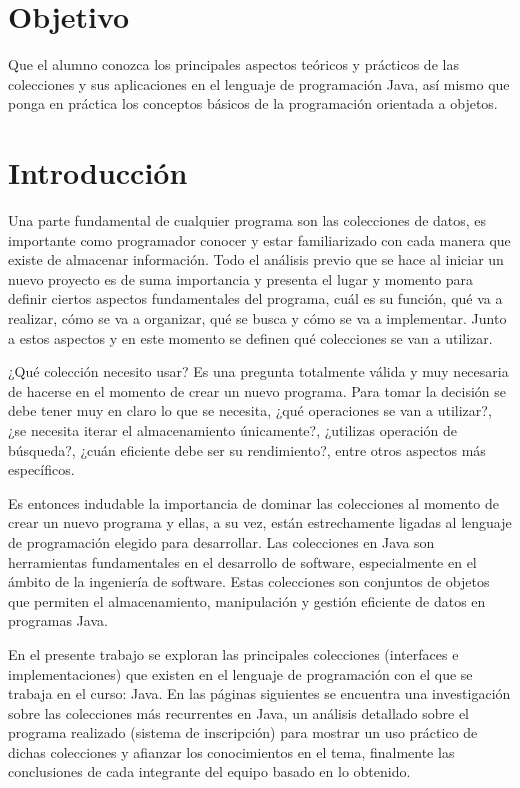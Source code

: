 \documentclass[a4paper,12pt]{article}
\begin{document}
\section{Objetivo}
Que el alumno conozca los principales aspectos teóricos y prácticos de las colecciones y sus aplicaciones en el lenguaje de programación Java, así mismo que ponga en práctica los conceptos básicos de la programación orientada a objetos.

\section{Introducción}

Una parte fundamental de cualquier programa son las colecciones de datos, es importante como programador conocer y estar familiarizado con cada manera que existe de almacenar información. Todo el análisis previo que se hace al iniciar un nuevo proyecto es de suma importancia y presenta el lugar y momento para definir ciertos aspectos fundamentales del programa, cuál es su función, qué va a realizar, cómo se va a organizar, qué se busca y cómo se va a implementar. Junto a estos aspectos y en este momento se definen qué colecciones se van a utilizar.

¿Qué colección necesito usar? Es una pregunta totalmente válida y muy necesaria de hacerse en el momento de crear un nuevo programa. Para tomar la decisión se debe tener muy en claro lo que se necesita, ¿qué operaciones se van a utilizar?, ¿se necesita iterar el almacenamiento únicamente?, ¿utilizas operación de búsqueda?, ¿cuán eficiente debe ser su rendimiento?, entre otros aspectos más específicos.

Es entonces indudable la importancia de dominar las colecciones al momento de crear un nuevo programa y ellas, a su vez, están estrechamente ligadas al lenguaje de programación elegido para desarrollar. Las colecciones en Java son herramientas fundamentales en el desarrollo de software, especialmente en el ámbito de la ingeniería de software. Estas colecciones son conjuntos de objetos que permiten el almacenamiento, manipulación y gestión eficiente de datos en programas Java.

En el presente trabajo se exploran las principales colecciones (interfaces e implementaciones) que existen en el lenguaje de programación con el que se trabaja en el curso: Java. En las páginas siguientes se encuentra una investigación sobre las colecciones más recurrentes en Java, un análisis detallado sobre el programa realizado (sistema de inscripción) para mostrar un uso práctico de dichas colecciones y afianzar los conocimientos en el tema, finalmente las conclusiones de cada integrante del equipo basado en lo obtenido.
\end{document}
